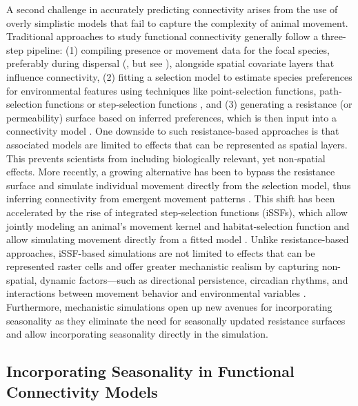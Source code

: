 \documentclass[abstract=on,10pt,a4paper,bibliography=totocnumbered]{article}
\begin{document}
A second challenge in accurately predicting connectivity arises from the use of
overly simplistic models that fail to capture the complexity of animal movement.
Traditional approaches to study functional connectivity generally follow a
three-step pipeline: (1) compiling presence or movement data for the focal
species, preferably during dispersal (\citealp{Elliot.2014, Vasudev.2015,
Benz.2016}, but see \citealp{Fattebert.2015}), alongside spatial covariate
layers that influence connectivity, (2) fitting a selection model to estimate
species preferences for environmental features using techniques like
point-selection functions, path-selection functions or step-selection functions
\citep{Boyce.2002, Manly.2007, Cushman.2010}, and (3) generating a resistance
(or permeability) surface based on inferred preferences, which is then input
into a connectivity model \citep{Zeller.2012, Diniz.2019}. One downside to such
resistance-based approaches is that associated models are limited to effects
that can be represented as spatial layers. This prevents scientists from
including biologically relevant, yet non-spatial effects. More recently, a
growing alternative has been to bypass the resistance surface and simulate
individual movement directly from the selection model, thus inferring
connectivity from emergent movement patterns \citep{Kanagaraj.2013, Allen.2016,
Hauenstein.2019, Zeller.2020, UnnithanKumar.2022a, UnnithanKumar.2022,
Hofmann.2023}. This shift has been accelerated by the rise of integrated
step-selection functions (iSSFs), which allow jointly modeling an animal's
movement kernel and habitat-selection function \citep{Avgar.2016, Fieberg.2021}
and allow simulating movement directly from a fitted model \citep{Avgar.2016,
Signer.2017}. Unlike resistance-based approaches, iSSF-based simulations are
not limited to effects that can be represented raster cells and offer greater
mechanistic realism by capturing non-spatial, dynamic factors—such as
directional persistence, circadian rhythms, and interactions between movement
behavior and environmental variables \citep{Hofmann.2023, Potts.2023,
Signer.2024, Forrest.2024}. Furthermore, mechanistic simulations open up new
avenues for incorporating seasonality as they eliminate the need for seasonally
updated resistance surfaces and allow incorporating seasonality directly in the
simulation.

\subsection{Incorporating Seasonality in Functional Connectivity Models}
\end{document}
